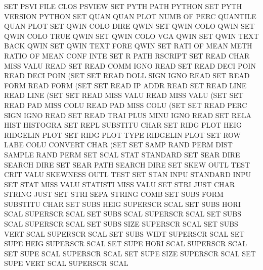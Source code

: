 SET      PSVI FILE CLOS                 PSVIEW
SET      PYTH PATH                      PYTHON
SET      PYTH VERSION                   PYTHON
SET      QUAN QUAN PLOT NUMB OF   PERC  QUANTILE QUAN PLOT
SET      QWIN COLO DIRE                 QWIN
SET      QWIN COLO                      QWIN
SET      QWIN COLO TRUE                 QWIN
SET      QWIN COLO VGA                  QWIN
SET      QWIN TEXT BACK                 QWIN
SET      QWIN TEXT FORE                 QWIN
SET      RATI OF   MEAN METH            RATIO   OF    MEAN CONF INTE
SET      R    PATH                      RSCRIPT
SET      READ CHAR MISS VALU            READ
SET      READ COMM IGNO                 READ
SET      READ DECI POIN                 READ     DECI POIN (SET
SET      READ DOLL SIGN IGNO            READ
SET      READ FORM                      READ     FORM (SET
SET      READ IP   ADDR                 READ
SET      READ LINE                      READ     LINE (SET
SET      READ MISS VALU                 READ     MISS VALU (SET
SET      READ PAD  MISS COLU            READ     PAD  MISS COLU (SET
SET      READ PERC SIGN IGNO            READ
SET      READ TRAI PLUS MINU IGNO       READ
SET      RELA HIST                      HISTOGRA
SET      REPL                           SUBSTITU CHAR
SET      RIDG PLOT HEIG                 RIDGELIN PLOT
SET      RIDG PLOT TYPE                 RIDGELIN PLOT
SET      ROW  LABE COLU                 CONVERT  CHAR (SET
SET      SAMP RAND PERM DIST            SAMPLE   RAND PERM
SET      SCAL STAT                      STANDARD
SET      SEAR DIRE                      SEARCH   DIRE
SET      SEAR PATH                      SEARCH   DIRE
SET      SKEW OUTL TEST CRIT VALU       SKEWNESS OUTL TEST
SET      STAN INPU                      STANDARD INPU
SET      STAT MISS VALU                 STATISTI MISS VALU
SET      STRI JUST CHAR                 STRING   JUST
SET      STRI SEPA                      STRING   COMB
SET      SUBS FORM                      SUBSTITU CHAR
SET      SUBS HEIG                      SUPERSCR SCAL
SET      SUBS HORI SCAL                 SUPERSCR SCAL
SET      SUBS SCAL                      SUPERSCR SCAL
SET      SUBS SCAL                      SUPERSCR SCAL
SET      SUBS SIZE                      SUPERSCR SCAL
SET      SUBS VERT SCAL                 SUPERSCR SCAL
SET      SUBS WIDT                      SUPERSCR SCAL
SET      SUPE HEIG                      SUPERSCR SCAL
SET      SUPE HORI SCAL                 SUPERSCR SCAL
SET      SUPE SCAL                      SUPERSCR SCAL
SET      SUPE SIZE                      SUPERSCR SCAL
SET      SUPE VERT SCAL                 SUPERSCR SCAL

